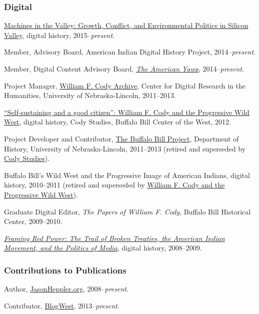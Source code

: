 \subsubsection{Digital}\label{digital}

\href{http://dissertation.jasonheppler.org}{Machines in the Valley:
Growth, Conflict, and Environmental Politics in Silicon Valley}, digital
history, 2015--\emph{present}.

Member, Advisory Board, American Indian Digital History Project,
2014--\emph{present}.

Member, Digital Content Advisory Board,
\emph{\href{http://www.americanyawp.com/}{The American Yawp}},
2014--\emph{present}.

Project Manager, \href{http://codyarchive.org/}{William F. Cody
Archive}, Center for Digital Research in the Humanities, University of
Nebraska-Lincoln, 2011--2013.

\href{http://www.codystudies.org/showindians/}{``Self-sustaining and a
good citizen'': William F. Cody and the Progressive Wild West}, digital
history, Cody Studies, Buffalo Bill Center of the West, 2012.

Project Developer and Contributor,
\href{http://buffalobillproject.unl.edu/}{The Buffalo Bill Project},
Department of History, University of Nebraska-Lincoln, 2011--2013
(retired and superseded by \href{http://www.codystudies.org/}{Cody
Studies}).

Buffalo Bill's Wild West and the Progressive Image of American Indians,
digital history, 2010--2011 (retired and superseded by
\href{http://www.codystudies.org/showindians/}{William F. Cody and the
Progressive Wild West}).

Graduate Digital Editor, \emph{The Papers of William F. Cody}, Buffalo
Bill Historical Center, 2009--2010.

\emph{\href{http://framingredpower.org}{Framing Red Power: The Trail of
Broken Treaties, the American Indian Movement, and the Politics of
Media}}, digital history, 2008--2009.

\subsubsection{Contributions to
Publications}\label{contributions-to-publications}

Author, \href{http://jasonheppler.org}{JasonHeppler.org},
2008--\emph{present}.

Contributor, \href{http://blogwest.org/}{BlogWest},
2013--\emph{present}.

